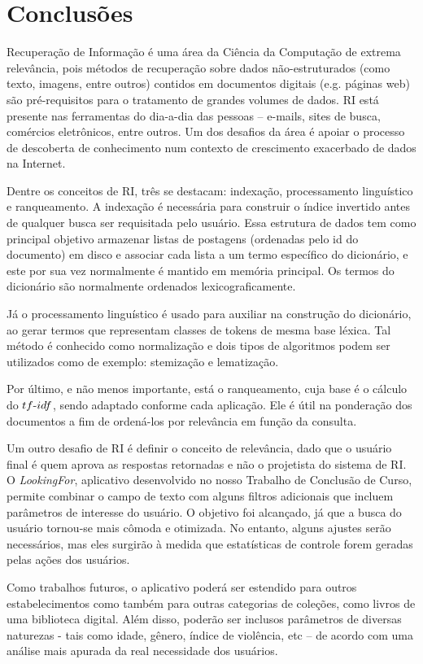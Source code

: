 \chapter{Conclusões}
\label{cap:conclusoes}

Recuperação de Informação é uma área da Ciência da Computação de extrema relevância, pois métodos de recuperação sobre dados não-estruturados (como texto, imagens, entre outros) contidos em documentos digitais (e.g. páginas web) são pré-requisitos para o tratamento de grandes volumes de dados. RI está presente nas ferramentas do dia-a-dia das pessoas – e-mails, sites de busca, comércios eletrônicos, entre outros. Um dos desafios da área é apoiar o processo de descoberta de conhecimento num contexto de crescimento exacerbado de dados na Internet.

Dentre os conceitos de RI, três se destacam: indexação, processamento linguístico e ranqueamento. A indexação é necessária para construir o índice invertido antes de qualquer busca ser requisitada pelo usuário. Essa estrutura de dados tem como principal objetivo armazenar listas de postagens (ordenadas pelo id do documento) em disco e associar cada lista a um termo específico do dicionário, e este por sua vez normalmente é mantido em memória principal. Os termos do dicionário são normalmente ordenados lexicograficamente.

Já o processamento linguístico é usado para auxiliar na construção do dicionário, ao gerar termos que representam classes de tokens de mesma base léxica. Tal método é conhecido como normalização e dois tipos de algoritmos podem ser utilizados como de exemplo: stemização e lematização.

Por último, e não menos importante, está o ranqueamento, cuja base é o cálculo do $tf\textnormal{-}idf$, sendo adaptado conforme cada aplicação. Ele é útil na ponderação dos documentos a fim de ordená-los por relevância em função da consulta.

Um outro desafio de RI é definir o conceito de relevância, dado que o usuário final é quem aprova as respostas retornadas e não o projetista do sistema de RI. O \emph{LookingFor}, aplicativo desenvolvido no nosso Trabalho de Conclusão de Curso, permite combinar o campo de texto com alguns filtros adicionais que incluem parâmetros de interesse do usuário. O objetivo foi alcançado, já que a busca do usuário tornou-se mais cômoda e otimizada. No entanto, alguns ajustes serão necessários, mas eles surgirão à medida que estatísticas de controle forem geradas pelas ações dos usuários.

Como trabalhos futuros, o aplicativo poderá ser estendido para outros estabelecimentos como também para outras categorias de coleções, como livros de uma biblioteca digital. Além disso, poderão ser inclusos parâmetros de diversas naturezas - tais como idade, gênero, índice de violência, etc – de acordo com uma análise mais apurada da real necessidade dos usuários.